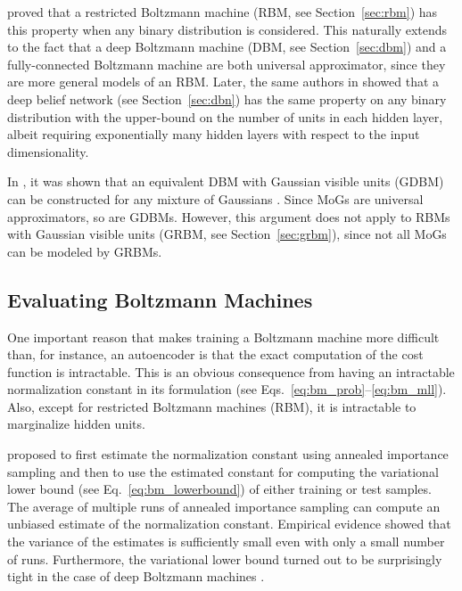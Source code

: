 \documentclass[dissertation,nocontribution,draft*]{aaltoseries}
\begin{document}
\citet{Roux2008} proved that a restricted Boltzmann machine
(RBM, see Section~\ref{sec:rbm}) has this property when any
binary distribution is considered. This naturally extends to
the fact that a deep Boltzmann machine (DBM, see
Section~\ref{sec:dbm}) and a fully-connected Boltzmann
machine are both universal approximator, since they are more
general models of an RBM.  Later, the same authors in
\citep{Roux2010} showed that a deep belief network (see
Section~\ref{sec:dbn}) has the same property on any binary
distribution with the upper-bound on the number of units in
each hidden layer, albeit requiring exponentially many
hidden layers with respect to the input dimensionality. 

In , it was shown that an equivalent
DBM with Gaussian visible units (GDBM) can be constructed for any
mixture of Gaussians \citep[MoG, see, e.g.,][]{Bishop2006}.
Since MoGs are universal approximators, so are GDBMs.
However, this argument does not apply to RBMs with Gaussian
visible units (GRBM, see Section~\ref{sec:grbm}), since not
all MoGs can be modeled by GRBMs.

\subsection{Evaluating Boltzmann Machines}
\label{sec:eval_bm}

One important reason that makes training a Boltzmann machine
more difficult than, for instance, an autoencoder is that
the exact computation of the cost function is intractable.
This is an obvious consequence from having an intractable
normalization constant in its formulation (see
Eqs.~\eqref{eq:bm_prob}--\eqref{eq:bm_mll}). Also,
except for restricted Boltzmann machines (RBM), it is
intractable to marginalize hidden units.

\citet{Salakhutdinov2008} proposed to first estimate the
normalization constant using annealed importance sampling
\citep{Neal1998} and then to use the estimated constant for
computing the variational lower bound (see
Eq.~\eqref{eq:bm_lowerbound}) of either training or test
samples. The average of multiple runs of annealed
importance sampling can compute an unbiased estimate of the
normalization constant. Empirical evidence
\citep{Salakhutdinov2008} showed that the variance of the
estimates is sufficiently small even with only a small
number of runs.  Furthermore, the variational lower bound
turned out to be surprisingly tight in the case of deep
Boltzmann machines \citep{Salakhutdinov2012nc}.
\end{document}
